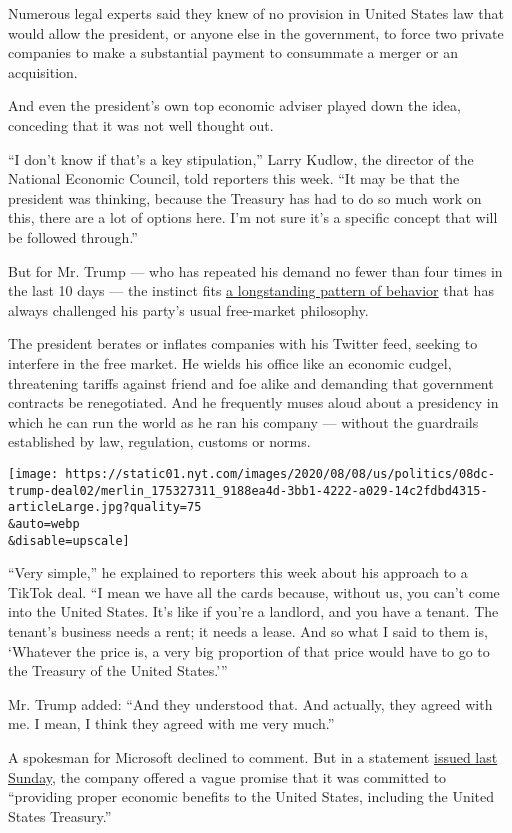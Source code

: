 Numerous legal experts said they knew of no provision in United States
law that would allow the president, or anyone else in the government, to
force two private companies to make a substantial payment to consummate
a merger or an acquisition.

And even the president's own top economic adviser played down the idea,
conceding that it was not well thought out.

``I don't know if that's a key stipulation,'' Larry Kudlow, the director
of the National Economic Council, told reporters this week. ``It may be
that the president was thinking, because the Treasury has had to do so
much work on this, there are a lot of options here. I'm not sure it's a
specific concept that will be followed through.''

But for Mr. Trump --- who has repeated his demand no fewer than four
times in the last 10 days --- the instinct fits
\href{https://www.nytimes.com/2020/08/03/business/economy/trump-tiktok-china-business.html}{a
longstanding pattern of behavior} that has always challenged his party's
usual free-market philosophy.

The president berates or inflates companies with his Twitter feed,
seeking to interfere in the free market. He wields his office like an
economic cudgel, threatening tariffs against friend and foe alike and
demanding that government contracts be renegotiated. And he frequently
muses aloud about a presidency in which he can run the world as he ran
his company --- without the guardrails established by law, regulation,
customs or norms.

\texttt{[image: https://static01.nyt.com/images/2020/08/08/us/politics/08dc-trump-deal02/merlin\_175327311\_9188ea4d-3bb1-4222-a029-14c2fdbd4315-articleLarge.jpg?quality=75\\\&auto=webp\\\&disable=upscale]}

``Very simple,'' he explained to reporters this week about his approach
to a TikTok deal. ``I mean we have all the cards because, without us,
you can't come into the United States. It's like if you're a landlord,
and you have a tenant. The tenant's business needs a rent; it needs a
lease. And so what I said to them is, `Whatever the price is, a very big
proportion of that price would have to go to the Treasury of the United
States.'''

Mr. Trump added: ``And they understood that. And actually, they agreed
with me. I mean, I think they agreed with me very much.''

A spokesman for Microsoft declined to comment. But in a statement
\href{https://blogs.microsoft.com/blog/2020/08/02/microsoft-to-continue-discussions-on-potential-tiktok-purchase-in-the-united-states/}{issued
last Sunday}, the company offered a vague promise that it was committed
to ``providing proper economic benefits to the United States, including
the United States Treasury.''

